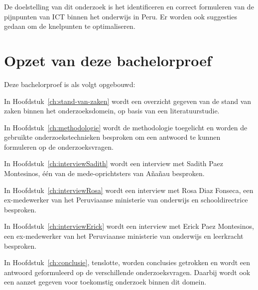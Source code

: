 
De doelstelling van dit onderzoek is het identificeren en correct formuleren van de pijnpunten van ICT binnen het onderwijs in Peru. Er worden ook suggesties gedaan om de knelpunten te optimaliseren.

\section{Opzet van deze bachelorproef}
\label{sec:opzet-bachelorproef}


Deze bachelorproef is als volgt opgebouwd:

In Hoofdstuk~\ref{ch:stand-van-zaken} wordt een overzicht gegeven van de stand van zaken binnen het onderzoeksdomein, op basis van een literatuurstudie.

In Hoofdstuk~\ref{ch:methodologie} wordt de methodologie toegelicht en worden de gebruikte onderzoekstechnieken besproken om een antwoord te kunnen formuleren op de onderzoeksvragen.

In Hoofdstuk~\ref{ch:interviewSadith} wordt een interview met Sadith Paez Montesinos, één van de mede-oprichtsters van Añañau besproken.

In Hoofdstuk~\ref{ch:interviewRosa} wordt een interview met Rosa Diaz Fonseca, een ex-medewerker van het Peruviaanse ministerie van onderwijs en schooldirectrice besproken.

In Hoofdstuk~\ref{ch:interviewErick} wordt een interview met Erick Paez Montesinos, een ex-medewerker van het Peruviaanse ministerie van onderwijs en leerkracht besproken.

In Hoofdstuk~\ref{ch:conclusie}, tenslotte, worden conclusies getrokken en wordt een antwoord geformuleerd op de verschillende onderzoeksvragen. Daarbij wordt ook een aanzet gegeven voor toekomstig onderzoek binnen dit domein.